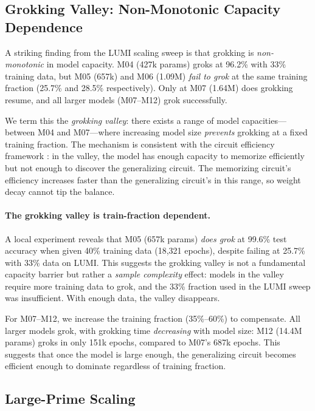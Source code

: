 \documentclass[11pt]{article}
\begin{document}
\subsection{Grokking Valley: Non-Monotonic Capacity Dependence}

A striking finding from the LUMI scaling sweep is that grokking is \emph{non-monotonic} in model capacity. M04 (427k params) groks at 96.2\% with 33\% training data, but M05 (657k) and M06 (1.09M) \emph{fail to grok} at the same training fraction (25.7\% and 28.5\% respectively). Only at M07 (1.64M) does grokking resume, and all larger models (M07--M12) grok successfully.

We term this the \emph{grokking valley}: there exists a range of model capacities---between M04 and M07---where increasing model size \emph{prevents} grokking at a fixed training fraction. The mechanism is consistent with the circuit efficiency framework \citep{varma2023explaining}: in the valley, the model has enough capacity to memorize efficiently but not enough to discover the generalizing circuit. The memorizing circuit's efficiency increases faster than the generalizing circuit's in this range, so weight decay cannot tip the balance.

\paragraph{The grokking valley is train-fraction dependent.}
A local experiment reveals that M05 (657k params) \emph{does grok} at 99.6\% test accuracy when given 40\% training data (18,321 epochs), despite failing at 25.7\% with 33\% data on LUMI. This suggests the grokking valley is not a fundamental capacity barrier but rather a \emph{sample complexity} effect: models in the valley require more training data to grok, and the 33\% fraction used in the LUMI sweep was insufficient. With enough data, the valley disappears.

For M07--M12, we increase the training fraction (35\%--60\%) to compensate. All larger models grok, with grokking time \emph{decreasing} with model size: M12 (14.4M params) groks in only 151k epochs, compared to M07's 687k epochs. This suggests that once the model is large enough, the generalizing circuit becomes efficient enough to dominate regardless of training fraction.

\subsection{Large-Prime Scaling}
\end{document}
